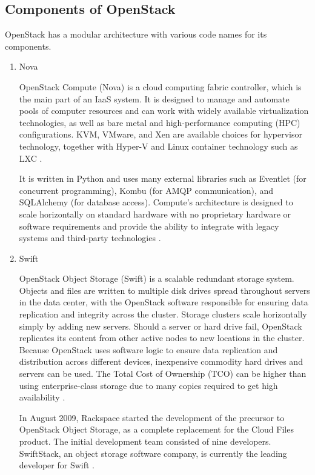      \subsection{Components of OpenStack}
         \par
         OpenStack has a modular architecture with various code names for its components.
         \begin{enumerate}
         \item Nova
         \par
         OpenStack Compute (Nova) is a cloud computing fabric controller, which is the main part of an IaaS system. It is designed to manage and automate pools of computer resources and can work with widely available virtualization technologies, as well as bare metal and high-performance computing (HPC) configurations. KVM, VMware, and Xen are available choices for hypervisor technology, together with Hyper-V and Linux container technology such as LXC \cite{openstack}\cite{wiki}.
         \par
         It is written in Python and uses many external libraries such as Eventlet (for concurrent programming), Kombu (for AMQP communication), and SQLAlchemy (for database access). Compute's architecture is designed to scale horizontally on standard hardware with no proprietary hardware or software requirements and provide the ability to integrate with legacy systems and third-party technologies \cite{openstack}\cite{wiki}.
        \item Swift
        \par
        OpenStack Object Storage (Swift) is a scalable redundant storage system. Objects and files are written to multiple disk drives spread throughout servers in the data center, with the OpenStack software responsible for ensuring data replication and integrity across the cluster. Storage clusters scale horizontally simply by adding new servers. Should a server or hard drive fail, OpenStack replicates its content from other active nodes to new locations in the cluster. Because OpenStack uses software logic to ensure data replication and distribution across different devices, inexpensive commodity hard drives and servers can be used. The Total Cost of Ownership (TCO) can be higher than using enterprise-class storage due to many copies required to get high availability \cite{openstack}\cite{wiki}.
        \par
        In August 2009, Rackspace started the development of the precursor to OpenStack Object Storage, as a complete replacement for the Cloud Files product. The initial development team consisted of nine developers. SwiftStack, an object storage software company, is currently the leading developer for Swift \cite{wiki}.

\end{enumerate}
